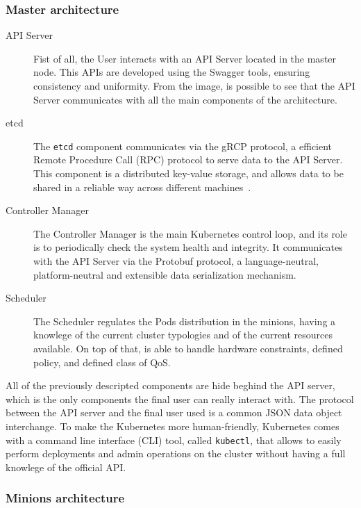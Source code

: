 \subsubsection{Master architecture}
\begin{description}
\item[API Server] Fist of all, the User interacts with an API Server located in
  the master node. This APIs are developed using the Swagger tools, ensuring
  consistency and uniformity. From the image, is possible to see that the API
  Server communicates with all the main components of the architecture.
\item[etcd] The \verb!etcd! component communicates via the gRCP protocol, a
  efficient Remote Procedure Call (RPC) protocol to serve data to the API
  Server. This component is a distributed key-value storage, and allows data to
  be shared in a reliable way across different machines~\cite{etcddatamodel}.
\item[Controller Manager] The Controller Manager is the main Kubernetes control
  loop, and its role is to periodically check the system health and integrity.
  It communicates with the API Server via the Protobuf protocol, a
  language-neutral, platform-neutral and extensible data serialization
  mechanism.
\item[Scheduler] The Scheduler regulates the Pods distribution in the minions,
  having a knowlege of the current cluster typologies and of the current
  resources available. On top of that, is able to handle hardware constraints,
  defined policy, and defined class of QoS.
\end{description}

All of the previously descripted components are hide beghind the API server,
which is the only components the final user can really interact with. The
protocol between the API server and the final user used is a common JSON data
object interchange. To make the Kubernetes more human-friendly, Kubernetes comes
with a command line interface (CLI) tool, called \verb!kubectl!, that allows to
easily perform deployments and admin operations on the cluster without having a
full knowlege of the official API.

\subsubsection{Minions architecture}

